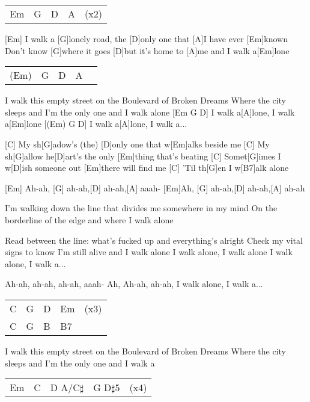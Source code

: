 

\begin{guitar}
	{\footnotesize\begin{tabular}{l|l|l|l l}
			Em & G & D & A & (x2)
	\end{tabular}}
	
	[Em] I walk a [G]lonely road, the [D]only one that [A]I have ever [Em]known
	Don't know [G]where it goes [D]but it's home to [A]me and I walk a[Em]lone
	{\footnotesize\begin{tabular}{l|l|l|l l}
			(Em) & G & D & A & 
	\end{tabular}}

	I walk this empty street on the Boulevard of Broken Dreams
	Where the city sleeps and I'm the only one and I walk alone
	[Em G D] I walk a[A]lone, I walk a[Em]lone
	[(Em) G D] I walk a[A]lone, I walk a...
	
	[C] My sh[G]adow's (the) [D]only one that w[Em]alks beside me
	[C] My sh[G]allow he[D]art's the only [Em]thing that's beating
	[C] Somet[G]imes I w[D]ish someone out [Em]there will find me
	[C] 'Til th[G]en I w[B7]alk alone
	
	[Em] Ah-ah, [G] ah-ah,[D] ah-ah,[A] aaah-
	[Em]Ah, [G]	ah-ah,[D] ah-ah,[A] ah-ah
	
	I'm walking down the line that divides me somewhere in my mind
	On the borderline of the edge and where I walk alone
	
	Read between the line: what's fucked up and everything's alright
	Check my vital signs to know I'm still alive and I walk alone
	I walk alone, I walk alone
	I walk alone, I walk a...
	
	 
	
	Ah-ah, ah-ah, ah-ah, aaah-
	Ah, Ah-ah, ah-ah, I walk alone, I walk a...
	
	{\footnotesize\begin{tabular}{l|l|l|l l}
			C & G & D & Em & (x3) \\
			C & G & B & B7 & 
	\end{tabular}}
	
	I walk this empty street on the Boulevard of Broken Dreams
	Where the city sleeps and I'm the only one and I walk a
	
	 
	
	{\footnotesize\begin{tabular}{l|l|l|l l}
			Em & C & D A/C$\sharp$ & G D$\sharp$5 & (x4)
	\end{tabular}}
\end{guitar}